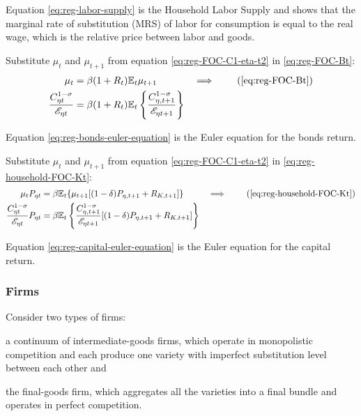 \documentclass[../thesis.tex]{subfiles}
\begin{document}
Equation \ref{eq:reg-labor-supply} is the Household Labor Supply and shows that the marginal rate of substitution (MRS) of labor for consumption is equal to the real wage, which is the relative price between labor and goods.

Substitute $\mu_t$ and $\mu_{t+1}$ from equation \ref{eq:reg-FOC-C1-eta-t2} in \ref{eq:reg-FOC-Bt}:
\begin{alignat}{2}
	\mu_t &= \beta (1 + R_{t}) \E{ \mu_{t+1}} &\implies \tag{\ref{eq:reg-FOC-Bt}} 
	\\
	\frac{ C_{\eta t}^{1-\sigma}}{ \te} &= \beta (1 + R_{t}) \E \left\{ \frac{ C_{\eta, t+1}^{1-\sigma}}{ \te[t+1]} \right\} \label{eq:reg-bonds-euler-equation}
\end{alignat}

Equation \ref{eq:reg-bonds-euler-equation} is the Euler equation for the bonds return.

Substitute $\mu_t$ and $\mu_{t+1}$ from equation \ref{eq:reg-FOC-C1-eta-t2} in \ref{eq:reg-household-FOC-Kt}:
\begin{alignat}{2}
	\mu_t P_{\eta t} &= \beta \mathbb{E}_t \{ \mu_{t+1} [(1-\delta) P_{\eta, t+1} + R_{K,t+1}] \} &\implies \tag{\ref{eq:reg-household-FOC-Kt}} 
	\\
	\frac{ C_{\eta t}^{1-\sigma}}{ \te} P_{\eta t} &= \beta \mathbb{E}_t \left\{ \frac{ C_{\eta, t+1}^{1-\sigma}}{ \te[t+1]} [(1-\delta) P_{\eta, t+1} + R_{K,t+1}] \right\} \label{eq:reg-capital-euler-equation}
\end{alignat}

Equation \ref{eq:reg-capital-euler-equation} is the Euler equation for the capital return.


\subsubsection*{Firms}

Consider two types of firms: 
\begin{enumerate*}[label=(\arabic*)]
	\item a continuum of intermediate-goods firms, which operate in monopolistic competition and each produce one variety with imperfect substitution level between each other and
	
	\item the final-goods firm, which aggregates all the varieties into a final bundle and operates in perfect competition.
\end{enumerate*}
\end{document}
